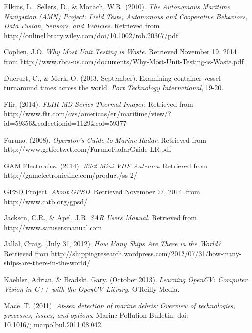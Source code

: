 \begin{thebibliography}{99}
\raggedright


 Elkins, L., Sellers, D., \& Monach, W.R. (2010). \textit{The Autonomous Maritime Navigation (AMN) Project: Field Tests, Autonomous and Cooperative Behaviors, Data Fusion, Sensors, and Vehicles}. Retrieved from http://onlinelibrary.wiley.com/doi/10.1002/rob.20367/pdf

 Coplien, J.O. \textit{Why Most Unit Testing is Waste}. Retrieved November 19, 2014 from http://www.rbcs-us.com/documents/Why-Most-Unit-Testing-is-Waste.pdf

 Ducruet, C., \& Merk, O. (2013, September). Examining container vessel turnaround times across the world. \textit{Port Technology International}, 19-20.

 Flir. (2014). \textit{FLIR MD-Series Thermal Imager}. Retrieved from http://www.flir.com/cvs/americas/en/maritime/view/?id=59356\&collectionid=1129\&col=59377

 Furuno. (2008). \textit{Operator's Guide to Marine Radar}. Retrieved from http://www.getfeetwet.com/FurunoRadarGuide-LR.pdf

 GAM Electronics. (2014). \textit{SS-2 Mini VHF Antenna}. Retrieved from http://gamelectronicsinc.com/product/ss-2/

 GPSD Project. \textit{About GPSD}. Retrieved November 27, 2014, from http://www.catb.org/gpsd/

 Jackson, C.R., \& Apel, J.R. \textit{SAR Users Manual}. Retrieved from http://www.sarusersmanual.com

 Jallal, Craig. (July 31, 2012). \textit{How Many Ships Are There in the World?} Retrieved from http://shippingresearch.wordpress.com/2012/07/31/how-many-ships-are-there-in-the-world/

 Kaehler, Adrian, \& Bradski, Gary. (October 2013). \textit{Learning OpenCV: Computer Vision in C++ with the OpenCV Library}. O'Reilly Media.

 Mace, T. (2011). \textit{At-sea detection of marine debris: Overview of technologies, processes, issues, and options}. Marine Pollution Bulletin. doi: 10.1016/j.marpolbul.2011.08.042


\end{thebibliography}
